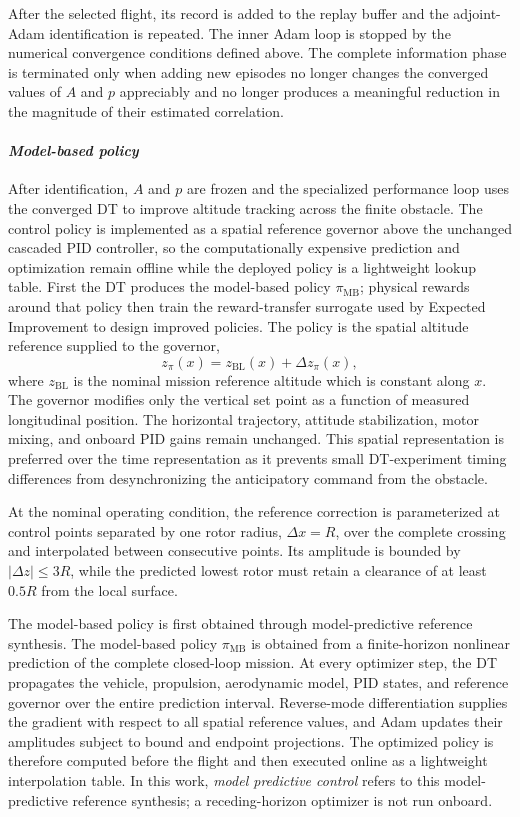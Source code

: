 \documentclass[journal]{IEEEtran}
\begin{document}
After the selected flight, its record is added to the replay buffer and the adjoint-Adam identification is repeated. The inner Adam loop is stopped by the numerical convergence conditions defined above. The complete information phase is terminated only when adding new episodes no longer changes the converged values of $A$ and $p$ appreciably and no longer produces a meaningful reduction in the magnitude of their estimated correlation.

\paragraph*{\textit{Model-based policy}}
\label{sec:mb-optimum}
After identification, $A$ and $p$ are frozen and the specialized performance loop uses the converged DT to improve altitude tracking across the finite obstacle. The control policy is implemented as a spatial reference governor above the unchanged cascaded PID controller, so the computationally expensive prediction and optimization remain offline while the deployed policy is a lightweight lookup table. First the DT produces the model-based policy $\pi_{\mathrm{MB}}$; physical rewards around that policy then train the reward-transfer surrogate used by Expected Improvement to design improved policies. The policy is the spatial altitude reference supplied to the governor,
\begin{equation}
 z_{\pi}(x)=z_{\mathrm{BL}}(x)+\Delta z_{\pi}(x),
 \label{eq:policy}
\end{equation}
where $z_{\mathrm{BL}}$ is the nominal mission reference altitude which is constant along $x$. The governor modifies only the vertical set point as a function of measured longitudinal position. The horizontal trajectory, attitude stabilization, motor mixing, and onboard PID gains remain unchanged. This spatial representation is preferred over the time representation as it prevents small DT-experiment timing differences from desynchronizing the anticipatory command from the obstacle.

At the nominal operating condition, the reference correction is parameterized at control points separated by one rotor radius, $\Delta x=R$, over the complete crossing and interpolated between consecutive points. Its amplitude is bounded by $|\Delta z|\leq3R$, while the predicted lowest rotor must retain a clearance of at least $0.5R$ from the local surface.

The model-based policy is first obtained through model-predictive reference synthesis.
The model-based policy $\pi_{\mathrm{MB}}$ is obtained from a finite-horizon nonlinear prediction of the complete closed-loop mission. At every optimizer step, the DT propagates the vehicle, propulsion, aerodynamic model, PID states, and reference governor over the entire prediction interval. Reverse-mode differentiation supplies the gradient with respect to all spatial reference values, and Adam updates their amplitudes subject to bound and endpoint projections. The optimized policy is therefore computed before the flight and then executed online as a lightweight interpolation table. In this work, \emph{model predictive control} refers to this model-predictive reference synthesis; a receding-horizon optimizer is not run onboard.
\end{document}
